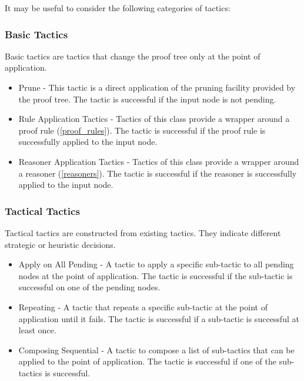 It may be useful to consider the following categories of tactics:

\subsubsection{Basic Tactics}

Basic tactics are tactics that change the proof tree only at the point of application.

\begin{itemize}
	\item     Prune - This tactic is a direct application of the pruning facility provided by the proof tree. The tactic is successful if the input node is not pending. 
	\item     Rule Application Tactics - Tactics of this class provide a wrapper around a proof rule (\ref{proof_rules}). The tactic is successful if the proof rule is successfully applied to the input node. 

	\item     Reasoner Application Tactics - Tactics of this class provide a wrapper around a reasoner (\ref{reasoners}). The tactic is successful if the reasoner is successfully applied to the input node. 
\end{itemize}

\subsubsection{Tactical Tactics}

Tactical tactics are constructed from existing tactics. They indicate different strategic or heuristic decisions.

\begin{itemize}
	\item         Apply on All Pending - A tactic to apply a specific sub-tactic to all pending nodes at the point of application. The tactic is successful if the sub-tactic is successful on one of the pending nodes. 
	\item         Repeating - A tactic that repeats a specific sub-tactic at the point of application until it fails. The tactic is successful if a sub-tactic is successful at least once. 
	\item         Composing Sequential - A tactic to compose a list of sub-tactics that can be applied to the point of application. The tactic is successful if one of the sub-tactics is successful. 
\end{itemize}

